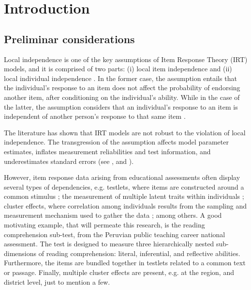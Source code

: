 \chapter{Introduction}

\section{Preliminar considerations}

Local independence is one of the key assumptions of Item Response Theory (IRT) models, and it is comprised of two parts: (i) local item independence and (ii) local individual independence \cite{Baker_2001, Hambleton_et_al_1991a}. In the former case, the assumption entails that the individual's response to an item does not affect the probability of endorsing another item, after conditioning on the individual's ability. While in the case of the latter, the assumption considers that an individual's response to an item is independent of another person's response to that same item \cite{Reckase_2009}. 

The literature has shown that IRT models are not robust to the violation of local independence. The transgression of the assumption affects model parameter estimates, inflates measurement reliabilities and test information, and underestimates standard errors (see \citet{Yen_1984, Chen_et_al_1997}, and  \citet{Jiao_et_al_2012}). 

However, item response data arising from educational assessments often display several types of dependencies, e.g. testlets, where items are constructed around a common stimulus \cite{Wainer_et_al_2007}; the measurement of multiple latent traits within individuals \cite{Reckase_2009}; cluster effects, where correlation among individuals results from the sampling and measurement mechanism used to gather the data \cite{Raudenbush_et_al_2002}; among others. A good motivating example, that will permeate this research, is the reading comprehension sub-test, from the Peruvian public teaching career national assessment. The test is designed to measure three hierarchically nested sub-dimensions of reading comprehension: literal, inferential, and reflective abilities. Furthermore, the items are bundled together in testlets related to a common text or passage. Finally, multiple cluster effects are present, e.g. at the region, and district level, just to mention a few.

